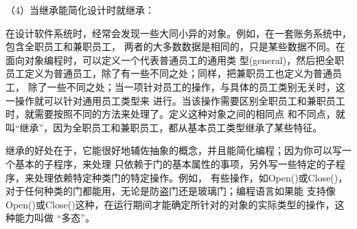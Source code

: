 \documentclass{article}
\begin{document}
\par
（4）当继承能简化设计时就继承：
\par
在设计软件系统时，经常会发现一些大同小异的对象。例如，在一套账务系统中，包含全职员工和兼职员工，
两者的大多数数据是相同的，只是某些数据不同。在面向对象编程时，可以定义一个代表普通员工的通用类
型(general)，然后把全职员工定义为普通员工，除了有一些不同之处；同样，把兼职员工也定义为普通员工，
除了一些不同之处；当一项针对员工的操作，与具体的员工类别无关时，这一操作就可以针对通用员工类型来
进行。当该操作需要区别全职员工和兼职员工时，就需要按照不同的方法来处理了。定义这种对象之间的相同点
和不同点，就叫“继承”，因为全职员工和兼职员工，都从基本员工类型继承了某些特征。
\par
继承的好处在于，它能很好地辅佐抽象的概念，并且能简化编程；因为你可以写一个基本的子程序，来处理
只依赖于门的基本属性的事项，另外写一些特定的子程序，来处理依赖特定种类门的特定操作。例如，
有些操作，如Open()或Close()，对于任何种类的门都能用，无论是防盗门还是玻璃门；编程语言如果能
支持像Open()或Close()这种，在运行期间才能确定所针对的对象的实际类型的操作，这种能力叫做
“多态”。
\end{document}
